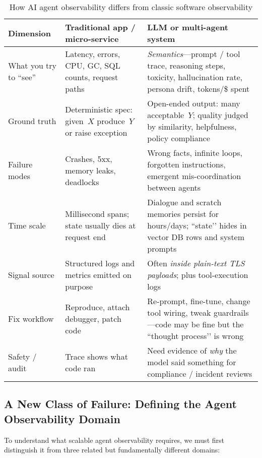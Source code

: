 \documentclass[sigplan,screen,review,9pt]{acmart}
\begin{document}
\begin{table*}[t]
  \caption{How AI agent observability differs from classic software observability}
  \label{tab:diff}
  \begin{tabularx}{\linewidth}{@{}>{\raggedright\arraybackslash}p{2.85cm}X X@{}}
    \toprule
    \textbf{Dimension} &
    \textbf{Traditional app / micro-service} &
    \textbf{LLM or multi-agent system} \\
    \midrule
    What you try to “see” &
    Latency, errors, CPU, GC, SQL counts, request paths &
    \emph{Semantics}—prompt / tool trace, reasoning steps, toxicity, hallucination rate, persona drift, tokens/\$ spent \\
    Ground truth &
    Deterministic spec: given~$X$ produce~$Y$ or raise exception &
    Open-ended output: many acceptable~$Y$; quality judged by similarity, helpfulness, policy compliance \\
    Failure modes &
    Crashes, 5xx, memory leaks, deadlocks &
    Wrong facts, infinite loops, forgotten instructions, emergent mis-coordination between agents \\
    Time scale &
    Millisecond spans; state usually dies at request end &
    Dialogue and scratch memories persist for hours/days; “state’’ hides in vector DB rows and system prompts \\
    Signal source &
    Structured logs and metrics emitted on purpose &
    Often \emph{inside plain-text TLS payloads}; plus tool-execution logs \\
    Fix workflow &
    Reproduce, attach debugger, patch code &
    Re-prompt, fine-tune, change tool wiring, tweak guardrails—code may be fine but the “thought process’’ is wrong \\
    Safety / audit &
    Trace shows what code ran &
    Need evidence of \emph{why} the model said something for compliance / incident reviews \\
    \bottomrule
  \end{tabularx}
\end{table*}

\subsection{A New Class of Failure: Defining the Agent Observability Domain}

To understand what scalable agent observability requires, we must first distinguish it from three related but fundamentally different domains:
\end{document}
